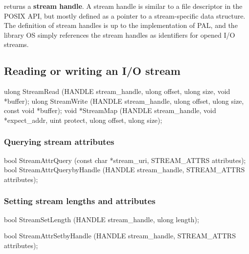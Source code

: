  returns a {\bf stream handle}. A stream handle is similar to a file descriptor in the POSIX API,
but mostly defined as a pointer to a stream-specific data structure.
The definition of stream handles is up to the implementation of PAL,
and the library OS simply references the stream handles as identifiers for opened I/O streams.




\subsection*{Reading or writing an I/O stream}



\begin{paldef}
ulong StreamRead  (HANDLE stream_handle, ulong offset,
                   ulong size, void *buffer);
ulong StreamWrite (HANDLE stream_handle, ulong offset,
                   ulong size, const void *buffer);
void *StreamMap   (HANDLE stream_handle,
                   void *expect_addr, uint protect,
                   ulong offset, ulong size);
\end{paldef}



\subsubsection*{Querying stream attributes}

\begin{paldef}
bool StreamAttrQuery (const char *stream_uri,
                      STREAM_ATTRS attributes);
bool StreamAttrQuerybyHandle (HANDLE stream_handle,
                              STREAM_ATTRS attributes);
\end{paldef}



\subsubsection*{Setting stream lengths and attributes}


\begin{paldef}
bool StreamSetLength (HANDLE stream_handle,
                      ulong length);
\end{paldef}


\begin{paldef}
bool StreamAttrSetbyHandle (HANDLE stream_handle,
                            STREAM_ATTRS attributes);
\end{paldef}




